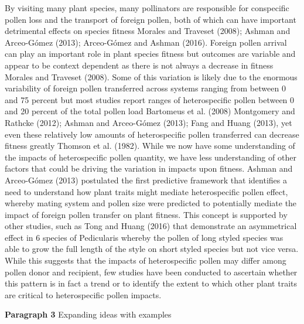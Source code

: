 \documentclass[11pt,a4paper]{article}
\begin{document}
By visiting many plant species, many pollinators are responsible for
conspecific pollen loss and the transport of foreign pollen, both of
which can have important detrimental effects on species fitness Morales
and Traveset (2008); Ashman and Arceo-Gómez (2013); Arceo-Gómez and
Ashman (2016). Foreign pollen arrival can play an important role in
plant species fitness but outcomes are variable and appear to be context
dependent as there is not always a decrease in fitness Morales and
Traveset (2008). Some of this variation is likely due to the enormous
variability of foreign pollen transferred across systems ranging from
between 0 and 75 percent but most studies report ranges of
heterospecific pollen between 0 and 20 percent of the total pollen load
Bartomeus et al. (2008) Montgomery and Rathcke (2012); Ashman and
Arceo-Gómez (2013); Fang and Huang (2013), yet even these relatively low
amounts of heterospecific pollen transferred can decrease fitness
greatly Thomson et al. (1982). While we now have some understanding of
the impacts of heterospecific pollen quantity, we have less
understanding of other factors that could be driving the variation in
impacts upon fitness. Ashman and Arceo-Gómez (2013) postulated the first
predictive framework that identifies a need to understand how plant
traits might mediate heterospecific pollen effect, whereby mating system
and pollen size were predicted to potentially mediate the impact of
foreign pollen transfer on plant fitness. This concept is supported by
other studies, such as Tong and Huang (2016) that demonstrate an
asymmetrical effect in 6 species of Pedicularis whereby the pollen of
long styled species was able to grow the full length of the style on
short styled species but not vice versa. While this suggests that the
impacts of heterospecific pollen may differ among pollen donor and
recipient, few studies have been conducted to ascertain whether this
pattern is in fact a trend or to identify the extent to which other
plant traits are critical to heterospecific pollen impacts.

\textbf{Paragraph 3} Expanding ideas with examples
\end{document}

